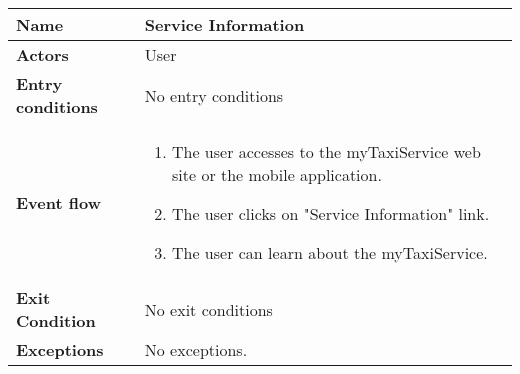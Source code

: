 \vspace{20pt}
\noindent
\begin{tabular}{l l}
 \textbf {Name} & Service Information  \\ \hline
 \textbf{Actors} & User \\ \hline
 \textbf{Entry conditions} & No entry conditions \\ \hline
 \textbf{Event flow} & 
 \parbox{0.9\textwidth}{
 \begin{enumerate}
 \item The user accesses to the myTaxiService web site or the mobile application.
 \item The user clicks on "Service Information" link.
 \item The user can learn about the myTaxiService.
 \end{enumerate}
 } \\ \hline
 \textbf{Exit Condition} & No exit conditions \\ \hline
 \textbf{Exceptions} & No exceptions.
\end{tabular}
